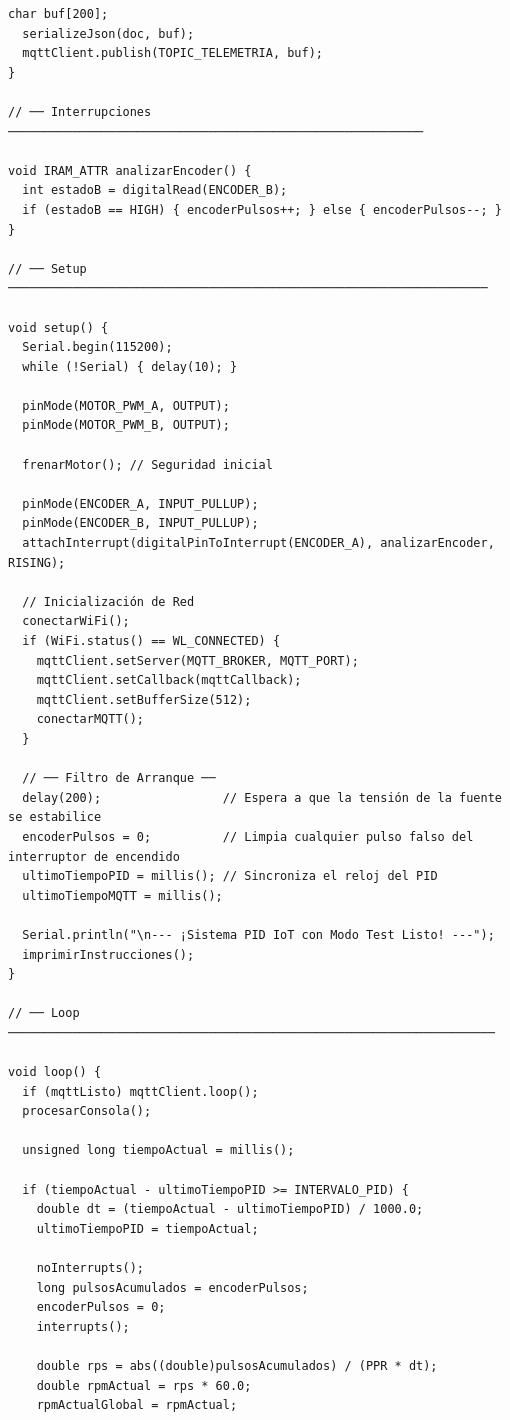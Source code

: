 \documentclass[11pt, letterpaper]{article}
\begin{document}
\begin{lstlisting}[caption={main.cpp --- PID + MQTT + publicaci\'on a InfluxDB}]
  char buf[200];
  serializeJson(doc, buf);
  mqttClient.publish(TOPIC_TELEMETRIA, buf);
}

// ── Interrupciones ──────────────────────────────────────────────────────────

void IRAM_ATTR analizarEncoder() {
  int estadoB = digitalRead(ENCODER_B);
  if (estadoB == HIGH) { encoderPulsos++; } else { encoderPulsos--; }
}

// ── Setup ───────────────────────────────────────────────────────────────────

void setup() {
  Serial.begin(115200);
  while (!Serial) { delay(10); } 

  pinMode(MOTOR_PWM_A, OUTPUT);
  pinMode(MOTOR_PWM_B, OUTPUT);
  
  frenarMotor(); // Seguridad inicial

  pinMode(ENCODER_A, INPUT_PULLUP);
  pinMode(ENCODER_B, INPUT_PULLUP);
  attachInterrupt(digitalPinToInterrupt(ENCODER_A), analizarEncoder, RISING);

  // Inicialización de Red
  conectarWiFi();
  if (WiFi.status() == WL_CONNECTED) {
    mqttClient.setServer(MQTT_BROKER, MQTT_PORT);
    mqttClient.setCallback(mqttCallback);
    mqttClient.setBufferSize(512);
    conectarMQTT();
  }

  // ── Filtro de Arranque ──
  delay(200);                 // Espera a que la tensión de la fuente se estabilice
  encoderPulsos = 0;          // Limpia cualquier pulso falso del interruptor de encendido
  ultimoTiempoPID = millis(); // Sincroniza el reloj del PID
  ultimoTiempoMQTT = millis();

  Serial.println("\n--- ¡Sistema PID IoT con Modo Test Listo! ---");
  imprimirInstrucciones();
}

// ── Loop ────────────────────────────────────────────────────────────────────

void loop() {
  if (mqttListo) mqttClient.loop();
  procesarConsola();

  unsigned long tiempoActual = millis();

  if (tiempoActual - ultimoTiempoPID >= INTERVALO_PID) {
    double dt = (tiempoActual - ultimoTiempoPID) / 1000.0; 
    ultimoTiempoPID = tiempoActual;

    noInterrupts();
    long pulsosAcumulados = encoderPulsos;
    encoderPulsos = 0; 
    interrupts();

    double rps = abs((double)pulsosAcumulados) / (PPR * dt);
    double rpmActual = rps * 60.0;
    rpmActualGlobal = rpmActual;


\end{lstlisting}
\end{document}
